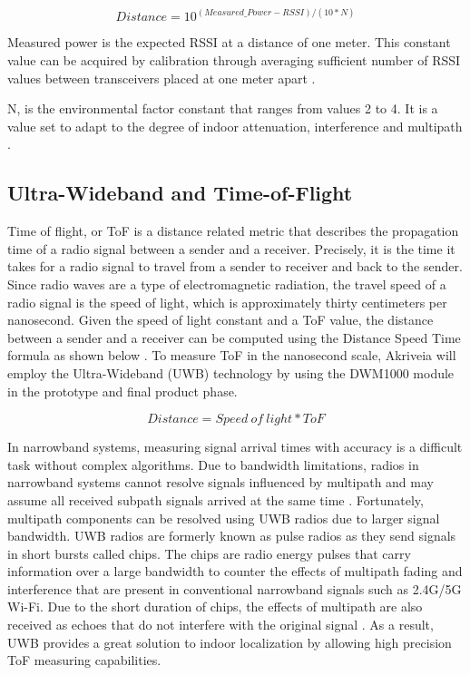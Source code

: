 \begin{equation*}
    Distance = 10^{(Measured\_Power - RSSI)/(10*N)}
\end{equation*}

\medskip
Measured power is the expected RSSI at a distance of one meter. This constant value can be acquired by calibration through averaging sufficient number of RSSI values between transceivers placed at one meter apart \cite{R2-5-3}.

\medskip
N, is the environmental factor constant that ranges from values 2 to 4. It is a value set to adapt to the degree of indoor attenuation, interference and multipath \cite{R2-5-3}.


\medskip
\subsection{Ultra-Wideband and Time-of-Flight}
\medskip
Time of flight, or ToF is a distance related metric that describes the propagation time of a radio signal between a sender and a receiver. Precisely, it is the time it takes for a radio signal to travel from a sender to receiver and back to the sender. Since radio waves are a type of electromagnetic radiation, the travel speed of a radio signal is the speed of light, which is approximately thirty centimeters per nanosecond. Given the speed of light constant and a ToF value, the distance between a sender and a receiver can be computed using the Distance Speed Time formula as shown below \cite{R2-5-1}. To measure ToF in the nanosecond scale, Akriveia will employ the Ultra-Wideband (UWB) technology by using the DWM1000 module in the prototype and final product phase.

\medskip
\begin{equation*}
    Distance = Speed\:of\:light * ToF
\end{equation*}

\medskip
In narrowband systems, measuring signal arrival times with accuracy is a difficult task without complex algorithms. Due to bandwidth limitations, radios in narrowband systems cannot resolve signals influenced by multipath and may assume all received subpath signals arrived at the same time \cite{R2-5-2}. Fortunately, multipath components can be resolved using UWB radios due to larger signal bandwidth. UWB radios are formerly known as pulse radios as they send signals in short bursts called chips. The chips are radio energy pulses that carry information over a large bandwidth to counter the effects of multipath fading and interference that are present in conventional narrowband signals such as 2.4G/5G Wi-Fi. Due to the short duration of chips, the effects of multipath are also received as echoes that do not interfere with the original signal \cite{R2-5-1}. As a result, UWB provides a great solution to indoor localization by allowing high precision ToF measuring capabilities.




